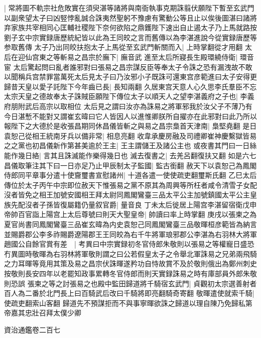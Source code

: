 |{
	常將圖不軌宗社危敗實在須臾湛等諸將與南衙執事克期誅翦伏願陛下暫至玄武門以副衆望太子曰凶竪悖亂誠合誅夷然聖躬不豫慮有驚動公等且止以俟後圖湛曰諸將弃家族共宰相同心匡輔社稷陛下奈何欲陷之鼎鑊陛下速出自止遏太子乃上馬就路按劉子玄中宗實録唐歷統紀皆以此為王同皎之言而舊傳以為李湛進說今從實録唐歷等参取舊傳}
太子乃出同皎扶抱太子上馬從至玄武門斬關而入|{
	上時掌翻從才用翻}
太后在迎仙宫東之等斬易之昌宗於廡下|{
	廡音武}
進至太后所寢長生殿環繞侍衛|{
	環音宦}
太后驚起問曰亂者誰邪對曰張易之昌宗謀反臣等奉太子令誅之恐有漏洩故不敢以聞稱兵宫禁罪當萬死太后見太子曰乃汝邪小子既誅可還東宫彦範進曰太子安得更歸昔天皇以愛子託陛下今年齒已長|{
	長知兩翻}
久居東宫天意人心久思李氏羣臣不忘太宗天皇之德故奉太子誅賊臣願陛下傳位太子以順天人之望李湛義府之子也|{
	李義府朋附武后高宗以取相位}
太后見之謂曰汝亦為誅易之將軍邪我於汝父子不薄乃有今日湛慙不能對又謂崔玄暐曰它人皆因人以進惟卿朕所自擢亦在此邪對曰此乃所以報陛下之大德於是收張昌期同休昌儀皆斬之與易之昌宗梟首天津南|{
	梟堅堯翻}
是日袁恕己從相王統南牙兵以備非常|{
	相息亮翻}
收韋承慶房融及司禮卿崔神慶繫獄皆易之之黨也初昌儀新作第甚美逾於王主|{
	王主謂儲王及諸公主也}
或夜書其門曰一日絲能作幾日絡|{
	言其且誅滅能作樂得幾日也}
滅去復書之|{
	去羌呂翻復扶又翻}
如是六七昌儀取筆注其下曰一日亦足乃止甲辰制太子監國|{
	監古銜翻}
赦天下以袁恕己為鳳閣侍郎同平章事分遣十使齎璽書宣慰諸州|{
	十道各遣一使使疏吏翻璽斯氏翻}
乙巳太后傳位於太子丙午中宗即位赦天下惟張易之黨不原其為周興等所枉者咸令清雪子女配沒者皆免之相王加號安國相王拜太尉同鳳閣鸞臺三品太平公主加號鎮國太平公主皇族先配沒者子孫皆復屬籍仍量叙官爵|{
	量音良}
丁未太后徙居上陽宫李湛留宿衛戊申帝帥百官詣上陽宫上太后尊號曰則天大聖皇帝|{
	帥讀曰率上時掌翻}
庚戌以張柬之為夏官尚書同鳳閣鸞臺三品崔玄暐為内史袁恕己同鳳閣鸞臺三品敬暉桓彦範皆為納言並賜爵郡公李多祚賜爵遼陽郡王王同皎為右千牛將軍琅邪郡公李湛為右羽林大將軍趙國公自餘官賞有差　|{
	考異曰中宗實録初冬官侍郎朱敬則以張易之等權寵日盛恐冇異圖時敬暉為右羽林將軍敬則謂之曰公若假皇太子之令舉北軍誅易之兄弟兩飛騎之力耳暉等竟用其策及易之昌宗伏誅暉遂矜功自恃故賞不及於敬則俄出為鄭州刺史按敬則長安四年以老罷知政事累轉冬官侍郎而則天實録誅易之時有庫部員外郎朱敬則恐誤}
張柬之等之討張易之也殿中監田歸道將千騎宿玄武門|{
	貞觀初太宗選善射者百人為二番於北門長上曰百騎武后改曰千騎將即亮翻騎奇寄翻}
敬暉遣使就索千騎|{
	使疏吏翻索山客翻}
歸道先不預謀拒而不與事寧暉欲誅之歸道以理自陳乃免歸私第帝嘉其忠壯召拜太僕少卿

資治通鑑卷二百七
